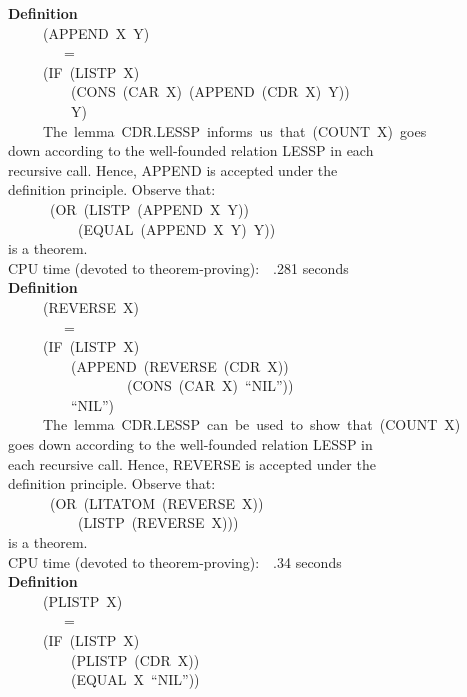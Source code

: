 \documentclass[10pt]{book}
\newenvironment{pubasis}{\begin{flushleft}}{\end{flushleft}}
\newcommand{\axiomordefinition}[1]{\vspace{6pt}\Large\textsf{\textbf{#1}}\normalsize}
\begin{document}
\begin{pubasis}
\axiomordefinition{Definition}\\
~~~~~(APPEND~X~Y)\\
~~~~~~~~=\\
~~~~~(IF~(LISTP~X)\\
~~~~~~~~~(CONS~(CAR~X)~(APPEND~(CDR~X)~Y))\\
~~~~~~~~~Y)\\

~~~~~The~lemma~CDR.LESSP~informs~us~that~(COUNT~X)~goes\\
down according to the well-founded relation LESSP in each\\
recursive call.  Hence, APPEND is accepted under the\\
definition principle.  Observe that:\\
~~~~~~(OR~(LISTP~(APPEND~X~Y))\\
~~~~~~~~~~(EQUAL~(APPEND~X~Y)~Y))\\
is a theorem.\\

CPU time (devoted to theorem-proving):~~.281 seconds\\

\axiomordefinition{Definition}\\
~~~~~(REVERSE~X)\\
~~~~~~~~=\\
~~~~~(IF~(LISTP~X)\\
~~~~~~~~~(APPEND~(REVERSE~(CDR~X))\\
~~~~~~~~~~~~~~~~~(CONS~(CAR~X)~``NIL''))\\
~~~~~~~~~``NIL'')\\

~~~~~The~lemma~CDR.LESSP~can~be~used~to~show~that~(COUNT~X)\\
goes down according to the well-founded relation LESSP in\\
each recursive call.  Hence, REVERSE is accepted under the\\
definition principle.  Observe that:\\
~~~~~~(OR~(LITATOM~(REVERSE~X))\\
~~~~~~~~~~(LISTP~(REVERSE~X)))\\
is a theorem.\\

CPU time (devoted to theorem-proving):~~.34 seconds\\

\axiomordefinition{Definition}\\
~~~~~(PLISTP~X)\\
~~~~~~~~=\\
~~~~~(IF~(LISTP~X)\\
~~~~~~~~~(PLISTP~(CDR~X))\\
~~~~~~~~~(EQUAL~X~``NIL''))\\


\end{pubasis}
\end{document}
